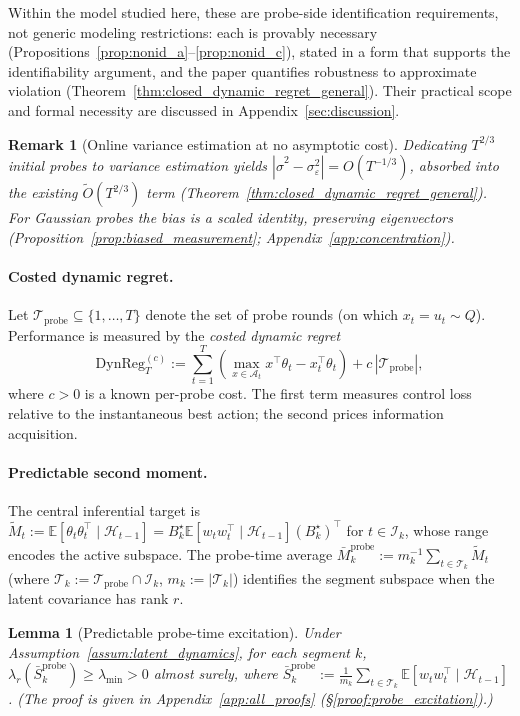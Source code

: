 \documentclass{article}
\newcommand{\E}{\mathbb{E}}
\newcommand{\cA}{\mathcal{A}}
\newcommand{\cH}{\mathcal{H}}
\newcommand{\cT}{\mathcal{T}}
\newcommand{\cI}{\mathcal{I}}
\newcommand{\cTprobe}{\mathcal{T}_{\mathrm{probe}}}
\newcommand{\DynReg}{\mathrm{DynReg}}
\newtheorem{lemma}{Lemma}
\newtheorem{remark}{Remark}
\begin{document}
Within the model studied here, these are probe-side identification requirements, not generic modeling restrictions: each is provably necessary (Propositions~\ref{prop:nonid_a}--\ref{prop:nonid_c}), stated in a form that supports the identifiability argument, and the paper quantifies robustness to approximate violation (Theorem~\ref{thm:closed_dynamic_regret_general}). Their practical scope and formal necessity are discussed in Appendix~\ref{sec:discussion}.
\begin{remark}[Online variance estimation at no asymptotic cost]
  \label{rem:burnin_free}
  Dedicating $T^{2/3}$ initial probes to variance estimation yields
  $|\hat\sigma^2 - \sigma_\varepsilon^2| = O(T^{-1/3})$, absorbed into the existing $\widetilde{O}(T^{2/3})$ term
  (Theorem~\ref{thm:closed_dynamic_regret_general}). For Gaussian probes the bias is a scaled identity, preserving eigenvectors (Proposition~\ref{prop:biased_measurement}; Appendix~\ref{app:concentration}).
  \end{remark}

\paragraph{Costed dynamic regret.}
Let $\cTprobe \subseteq \{1, \ldots, T\}$ denote the set of probe rounds (on which $x_t = u_t \sim Q$).
Performance is measured by the \emph{costed dynamic regret}
\begin{equation}
  \DynReg_T^{(c)} := \sum_{t=1}^T \left(\max_{x \in \cA_t} x^\top \theta_t - x_t^\top \theta_t\right) + c\,|\cTprobe|,
  \label{eq:costed_regret}
\end{equation}
where $c > 0$ is a known per-probe cost.
The first term measures control loss relative to the instantaneous best action; the second prices information acquisition.

\paragraph{Predictable second moment.} The central inferential target is $\widetilde{M}_t := \E[\theta_t \theta_t^\top \mid \cH_{t-1}] = B_k^\star \E[w_t w_t^\top \mid \cH_{t-1}] (B_k^\star)^\top$ for $t \in \cI_k$, whose range encodes the active subspace. The probe-time average $\bar{M}_k^{\mathrm{probe}} := m_k^{-1} \sum_{t \in \cT_k} \widetilde{M}_t$ (where $\cT_k := \cTprobe \cap \cI_k$, $m_k := |\cT_k|$) identifies the segment subspace when the latent covariance has rank $r$.

\begin{lemma}[Predictable probe-time excitation]\label{lem:probe_excitation}
Under Assumption~\ref{assum:latent_dynamics}, for each segment $k$, $\lambda_r(\bar S_k^{\mathrm{probe}})\ge \lambda_{\min} > 0$ almost surely, where $\bar S_k^{\mathrm{probe}} := \frac{1}{m_k}\sum_{t\in \cT_k}\E[w_t w_t^\top \mid \cH_{t-1}]$. (The proof is given in Appendix~\ref{app:all_proofs} (\S\ref{proof:probe_excitation}).)
\end{lemma}
\end{document}
